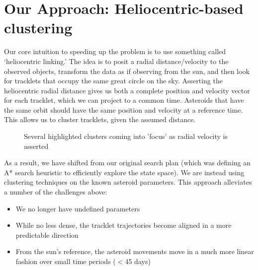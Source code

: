 \documentclass[11pt,letter]{article}
\begin{document}
\section*{Our Approach: Heliocentric-based clustering}
Our core intuition to speeding up the problem is to use something called `heliocentric linking.'\newline 
The idea is to posit a radial distance/velocity to the observed objects,  transform the data as if observing from the sun, and then look for tracklets that occupy the same great circle on the sky.
Asserting the heliocentric radial distance gives us both a complete position and velocity vector for each tracklet, which we can project to a common time.  Asteroids that have the same orbit should have the same position and velocity at a reference time.  This allows us to cluster tracklets, given the assumed distance.
\begin{figure}[!hp]%
    \centering
    \qquad
    \caption{Several highlighted clusters coming into 'focus' as radial velocity is asserted}%
    \label{fig:focus}%
\end{figure}
\newline\newline
As a result, we have shifted from our original search plan (which was defining an A* search heuristic to efficiently explore the state space).  We are instead using clustering techniques on the known asteroid parameters.  This approach alleviates a number of the challenges above:
\begin{itemize}
    \item We no longer have undefined parameters
    \item While no less dense, the tracklet trajectories become aligned in a more predictable direction
    \item From the sun's reference, the asteroid movements move in a much more linear fashion over small time periods ($<$45 days)
\end{itemize}
\end{document}
